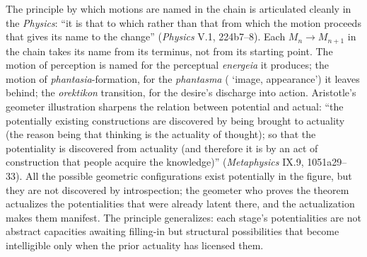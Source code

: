 The principle by which motions are named in the chain is articulated cleanly in the \textit{Physics}: ``it is that to which rather than that from which the motion proceeds that gives its name to the change'' (\textit{Physics} V.1, 224b7--8). Each $M_n \rightarrow M_{n+1}$ in the chain takes its name from its terminus, not from its starting point. The motion of perception is named for the perceptual \textit{energeia} it produces; the motion of \textit{phantasia}-formation, for the \textit{phantasma} ( `image, appearance') it leaves behind; the \textit{orektikon} transition, for the desire's discharge into action. Aristotle's geometer illustration sharpens the relation between potential and actual: ``the potentially existing constructions are discovered by being brought to actuality (the reason being that thinking is the actuality of thought); so that the potentiality is discovered from actuality (and therefore it is by an act of construction that people acquire the knowledge)'' (\textit{Metaphysics} IX.9, 1051a29--33). All the possible geometric configurations exist potentially in the figure, but they are not discovered by introspection; the geometer who proves the theorem actualizes the potentialities that were already latent there, and the actualization makes them manifest. The principle generalizes: each stage's potentialities are not abstract capacities awaiting filling-in but structural possibilities that become intelligible only when the prior actuality has licensed them.

